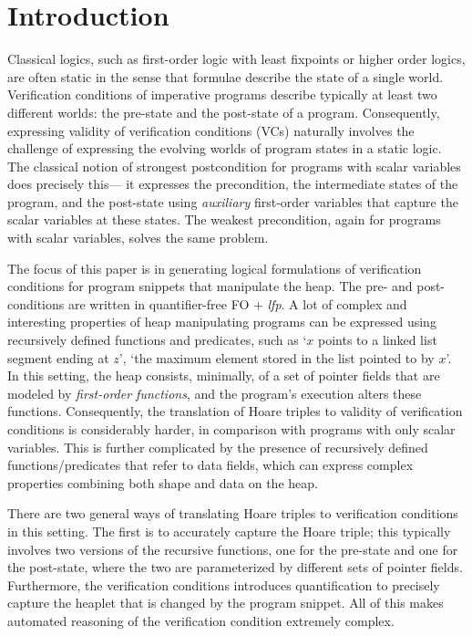 \section{Introduction}
\label{sec:intro}

Classical logics, such as first-order logic with least fixpoints or higher order logics, are often static in the sense that formulae 
describe the state of a single world. 
Verification conditions of imperative programs describe typically at least two different worlds: the pre-state
and the post-state of a program. Consequently, expressing validity of verification conditions (VCs)
naturally involves the challenge of expressing the evolving worlds of program states in a static logic.
The classical notion of strongest postcondition for programs with scalar variables does precisely this--- 
it expresses the precondition, the intermediate states of the program, and the post-state using \emph{auxiliary} 
first-order variables that capture the scalar variables at these states. The weakest precondition, again for
programs with scalar variables, solves the same problem.

The focus of this paper is in generating logical formulations of verification conditions for program snippets that manipulate the heap. The pre- and post-conditions are written in quantifier-free FO + \textit{lfp}. A lot of complex and interesting properties of heap manipulating programs can be expressed using recursively defined functions and predicates, such as `$x$ points to a linked list segment ending at $z$', `the maximum element stored in the list pointed to by $x$'. In this setting, the heap consists, minimally, of a set of pointer fields that are modeled by \emph{first-order
functions}, and the program's execution alters these functions.
Consequently, the translation of Hoare triples to validity of verification conditions is considerably harder, in comparison with programs with only scalar variables. This is further complicated by the presence of recursively defined functions/predicates that refer to data fields, which can express complex properties combining both shape and data on the heap.

There are two general ways of translating Hoare triples to verification conditions in this setting. The first is to accurately capture the Hoare triple; this typically involves two versions of the recursive functions, one for the pre-state and one for the post-state, where the two are parameterized by different sets of pointer fields. Furthermore, the verification conditions introduces quantification to precisely capture the heaplet that is changed by the program snippet. All of this makes automated reasoning of the verification condition extremely complex.

